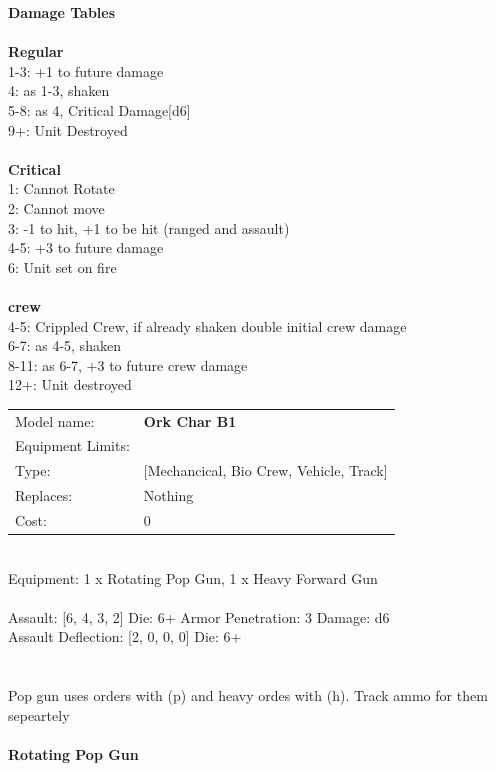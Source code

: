 {\bf Damage Tables} \\
\ \\ {\bf Regular } \\
1-3: +1 to future damage \\
4: as 1-3, shaken \\
5-8: as 4, Critical Damage[d6] \\
9+: Unit Destroyed \\
\ \\ {\bf Critical } \\
1: Cannot Rotate \\
2: Cannot move \\
3: -1 to hit, +1 to be hit (ranged and assault) \\
4-5: +3 to future damage \\
6: Unit set on fire \\
\ \\ {\bf crew } \\
4-5: Crippled Crew, if already shaken double initial crew damage \\
6-7: as 4-5, shaken \\
8-11: as 6-7, +3 to future crew damage \\
12+: Unit destroyed \\


\noindent
\begin{tabular}{ll}
Model name: &{\bf Ork Char B1 } \\
Equipment Limits: & \\
Type: &[Mechancical, Bio Crew, Vehicle, Track] \\
Replaces: &Nothing \\
Cost: & 0\\
\end{tabular}
\ \\
Equipment: 1 x Rotating Pop Gun, 1 x Heavy Forward Gun \\
\ \\
Assault: [6, 4, 3, 2] Die: 6+ Armor Penetration: 3 Damage: d6 \\
Assault Deflection: [2, 0, 0, 0] Die: 6+\\
\\ 
 
\ \\
Pop gun uses orders with (p) and heavy ordes with (h). Track ammo for them sepeartely\\ 

\ \\
{\bf Rotating Pop Gun } \\



